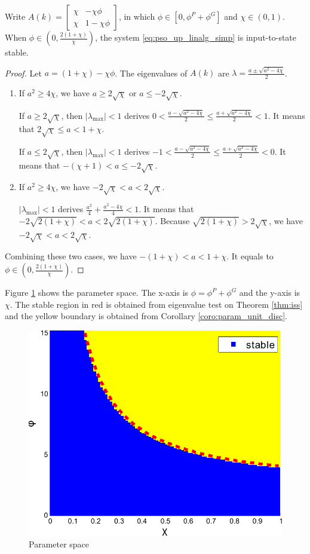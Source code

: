 \begin{mycoro}
\label{coro:param_unit_disc}
Write $ A(k) = 
\begin{bmatrix}
\chi & - \chi \phi \\
\chi & 1 - \chi \phi
\end{bmatrix}
$, in which
$ \phi \in [0,  \phi^{P} + \phi^{G} ] $ and $ \chi \in ( 0, 1 ) $.
When $ \phi \in (0 , \frac{2(1+\chi)}{\chi} ) $, the system \eqref{eq:pso_up_linalg_simp} is input-to-state stable.
\begin{proof}
Let $ a = (1 + \chi) - \chi \phi $. 
The eigenvalues of $ A(k) $ are
$ \lambda = \frac{ a \pm \sqrt{ a^{2} - 4 \chi } }{2} $.

\begin{enumerate}
\item If $ a^{2} \geq 4 \chi $, we have $ a \geq 2 \sqrt{\chi} $ or $ a \leq - 2 \sqrt{\chi} $.

If $ a \geq 2 \sqrt{\chi} $, then $ | \lambda_{\max} | < 1 $ derives $ 0 < \frac{a-\sqrt{a^{2}-4\chi}}{2} \leq \frac{a+\sqrt{a^{2}-4\chi}}{2} < 1 $.
It means that $ 2 \sqrt{ \chi } \leq a < 1 + \chi $.

If $ a \leq 2 \sqrt{\chi} $, then $ | \lambda_{\max} | < 1 $ derives $ -1 < \frac{a-\sqrt{a^{2}-4\chi}}{2} \leq \frac{a+\sqrt{a^{2}-4\chi}}{2} < 0 $.
It means that $ - (\chi+1) < a \leq - 2 \sqrt{\chi} $.

\item If $ a^{2} \geq 4 \chi $, we have $ - 2 \sqrt{\chi} < a < 2 \sqrt{\chi} $.

$ | \lambda_{\max} | < 1 $ derives $ \frac{ a^{2} }{4} + \frac{ a^{2} - 4\chi }{4} < 1 $.
It means that $ - 2 \sqrt{ 2(1+\chi) } < a < 2 \sqrt{ 2(1+\chi) } $.
Because $ \sqrt{ 2(1+\chi) } > 2 \sqrt{ \chi } $, we have $ - 2 \sqrt{\chi} < a < 2 \sqrt{\chi} $.
\end{enumerate}
Combining these two cases, we have  $ - (1 + \chi) < a < 1 + \chi $.
It equals to $ \phi \in (0 , \frac{2(1+\chi)}{\chi} ) $.

\end{proof}
\end{mycoro}

Figure \ref{fig:paramSpace} shows the parameter space.
The x-axis is $ \phi = \phi^{P} + \phi^{G} $ and the y-axis is $ \chi $.
The stable region in red is obtained from eigenvalue test on Theorem \ref{thm:iss} and the yellow boundary is obtained from Corollary \ref{coro:param_unit_disc}.
\begin{figure}
\centering
\includegraphics[width=0.5\linewidth]{./fig/param2}
\caption{Parameter space}
\label{fig:paramSpace}
\end{figure}


